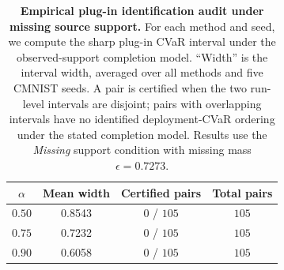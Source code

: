 \begin{table}[t]
\centering
\small
\caption{\textbf{Empirical plug-in identification audit under missing source support.} For each method and seed, we compute the sharp plug-in CVaR interval under the observed-support completion model. ``Width'' is the interval width, averaged over all methods and five CMNIST seeds. A pair is certified when the two run-level intervals are disjoint; pairs with overlapping intervals have no identified deployment-CVaR ordering under the stated completion model. Results use the \emph{Missing} support condition with missing mass $\epsilon=0.7273$.}
\label{tab:identification-audit-missing-tail}
\begin{tabular}{@{}cccc@{}}
\toprule
$\alpha$ & Mean width & Certified pairs & Total pairs \\
\midrule
$0.50$ & 0.8543 & 0 / $105$ & $105$ \\
$0.75$ & 0.7232 & 0 / $105$ & $105$ \\
$0.90$ & 0.6058 & 0 / $105$ & $105$ \\
\bottomrule
\end{tabular}
\end{table}
